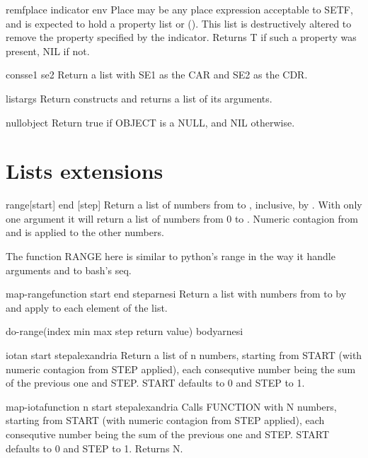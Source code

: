 \begin{macro}{remf}{place indicator \env env}{}{}
  Place may be any place expression acceptable to SETF, and is expected
  to hold a property list or (). This list is destructively altered to
  remove the property specified by the indicator. Returns T if such a
  property was present, NIL if not.
\end{macro}

\begin{class}{cons}{se1 se2}{}{}
  Return a list with SE1 as the CAR and SE2 as the CDR.
\end{class}

\begin{class}{list}{\rest args}{}{}
  Return constructs and returns a list of its arguments.
\end{class}

\begin{class}{null}{object}{}{}
  Return true if OBJECT is a NULL, and NIL otherwise.
\end{class}

\section{Lists extensions}
\label{sec:lists-extensions}

\begin{function}{range}{[start] end [step]}{}{}
  Return a list of numbers from  to , inclusive,
  by . With only one argument it will return a list of
  numbers from 0 to . Numeric contagion from  and
   is applied to the other numbers.
\begin{devnote}
  The function RANGE here is similar to python's range in the way it
  handle arguments and to bash's seq.
\end{devnote}
\end{function}

\begin{function}{map-range}{function start end \op step}{arnesi}{}
  Return a list with numbers from  to  by 
  and apply  to each element of the list.
\end{function}

\begin{macro}{do-range}{(index \op min max step return value) \body body}{arnesi}{}
  
\end{macro}

\begin{function}{iota}{n \key start step}{alexandria}{}
  Return a list of n numbers, starting from START (with numeric
  contagion from STEP applied), each consequtive number being the sum
  of the previous one and STEP. START defaults to 0 and STEP to 1.
\end{function}

\begin{function}{map-iota}{function n \key start step}{alexandria}{}
  Calls FUNCTION with N numbers, starting from START (with numeric contagion
from STEP applied), each consequtive number being the sum of the previous one
and STEP. START defaults to 0 and STEP to 1. Returns N.
\end{function}
